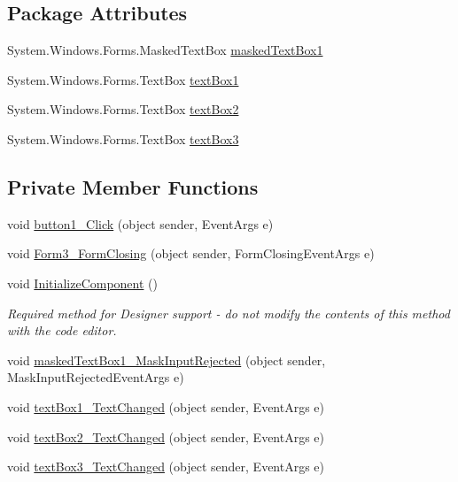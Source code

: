 \subsection*{Package Attributes}
\begin{DoxyCompactItemize}
\item 
System.\+Windows.\+Forms.\+Masked\+Text\+Box \hyperlink{class__7___doroshenko__forms2__is52_1_1_form3_afaddbc0ed494ada2c90b92ea0ff6d7a4}{masked\+Text\+Box1}
\item 
System.\+Windows.\+Forms.\+Text\+Box \hyperlink{class__7___doroshenko__forms2__is52_1_1_form3_a1ba2ed707ba4f2a23c6fdea67fa2ad2a}{text\+Box1}
\item 
System.\+Windows.\+Forms.\+Text\+Box \hyperlink{class__7___doroshenko__forms2__is52_1_1_form3_a38b9a5d99657bd9d2a565e367e4925f3}{text\+Box2}
\item 
System.\+Windows.\+Forms.\+Text\+Box \hyperlink{class__7___doroshenko__forms2__is52_1_1_form3_a66deab25b9348663a1c13b0a3cafc3b8}{text\+Box3}
\end{DoxyCompactItemize}
\subsection*{Private Member Functions}
\begin{DoxyCompactItemize}
\item 
void \hyperlink{class__7___doroshenko__forms2__is52_1_1_form3_a77c7b13a40218b6c1b9401bb82187636}{button1\+\_\+\+Click} (object sender, Event\+Args e)
\item 
void \hyperlink{class__7___doroshenko__forms2__is52_1_1_form3_abc403685bfbc9b5da1201d7ecd0ee1e5}{Form3\+\_\+\+Form\+Closing} (object sender, Form\+Closing\+Event\+Args e)
\item 
void \hyperlink{class__7___doroshenko__forms2__is52_1_1_form3_ab0dbbaf316cc4293987708f101ead42d}{Initialize\+Component} ()
\begin{DoxyCompactList}\small\item\em Required method for Designer support -\/ do not modify the contents of this method with the code editor. \end{DoxyCompactList}\item 
void \hyperlink{class__7___doroshenko__forms2__is52_1_1_form3_ac3f56359793ceb0d1149f7264dd29004}{masked\+Text\+Box1\+\_\+\+Mask\+Input\+Rejected} (object sender, Mask\+Input\+Rejected\+Event\+Args e)
\item 
void \hyperlink{class__7___doroshenko__forms2__is52_1_1_form3_ae0b02381848f523a55ededfae3026c11}{text\+Box1\+\_\+\+Text\+Changed} (object sender, Event\+Args e)
\item 
void \hyperlink{class__7___doroshenko__forms2__is52_1_1_form3_a99ad5cfebbfe9b80ef66203aaa3d777b}{text\+Box2\+\_\+\+Text\+Changed} (object sender, Event\+Args e)
\item 
void \hyperlink{class__7___doroshenko__forms2__is52_1_1_form3_ad5c48d9a356af6c3e3a9a727ec5c3898}{text\+Box3\+\_\+\+Text\+Changed} (object sender, Event\+Args e)
\end{DoxyCompactItemize}

